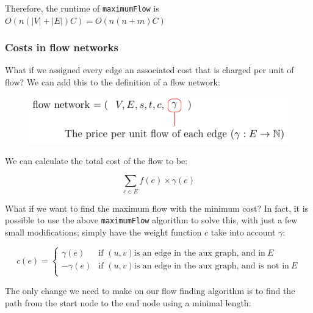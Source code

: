 Therefore, the runtime of \texttt{maximumFlow} is $O(n(|V| + |E|)C) =
O(n(n+m)C)$

\subsubsection{Costs in flow networks}

What if we assigned every edge an associated cost that is charged per unit of
flow? We can add this to the definition of a flow network:

\begin{figure}[H]
  \centering
  \includegraphics{equations/flow-network-costs}
  \label{fig:flow-network-definition-costs}
\end{figure}


We can calculate the total cost of the flow to be:

\[
  \sum_{e \in E} f(e) \times \gamma(e)
\]

What if we want to find the maximum flow with the minimum cost? In fact, it is
possible to use the above \texttt{maximumFlow} algorithm to solve this, with
just a few small modifications; simply have the weight function $c$ take into
account $\gamma$:

\[
    c(e) = 
    \begin{cases}
        \gamma(e) & \text{if } (u,v) \text{is an edge in the aux graph, and in}
          ~E\\
        -\gamma(e) & \text{if } (u,v) \text{is an edge in the aux graph, and is
          not in}~E\\
    \end{cases}
\]

The only change we need to make on our flow finding algorithm is to find the
path from the start node to the end node using a minimal length:

